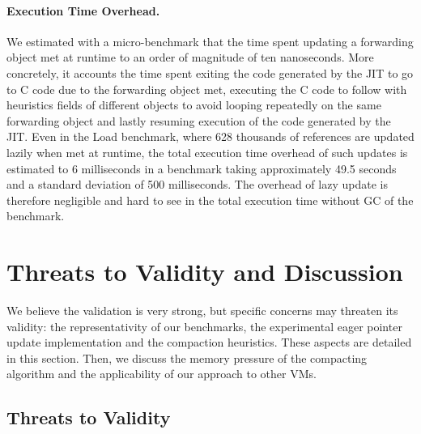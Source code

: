 \documentclass[sigplan,10pt,review,anonymous]{acmart}\settopmatter{printfolios=true,printccs=false,printacmref=false}
\begin{document}
\paragraph{Execution Time Overhead.} We estimated with a micro-benchmark that the time spent updating a forwarding object met at runtime to an order of magnitude of ten nanoseconds. More concretely, it  accounts the time spent exiting the code generated by the JIT to go to C code due to the forwarding object met, executing the C code to follow with heuristics fields of different objects to avoid looping repeatedly on the same forwarding object and lastly resuming execution of the code generated by the JIT. Even in the Load benchmark, where 628 thousands of references are updated lazily when met at runtime, the total execution time overhead of such updates is estimated to 6 milliseconds in a benchmark taking approximately 49.5 seconds and a standard deviation of 500 milliseconds. The overhead of lazy update is therefore negligible and hard to see in the total execution time without GC of the benchmark.


\section{Threats to Validity and Discussion}
\label{sec:threats}

We believe the validation is very strong, but specific concerns may threaten its validity: the representativity of our benchmarks, the experimental eager pointer update implementation and the compaction heuristics. These aspects are detailed in this section. Then, we discuss the memory pressure of the compacting algorithm and the applicability of our approach to other VMs.

\subsection{Threats to Validity}
\end{document}
